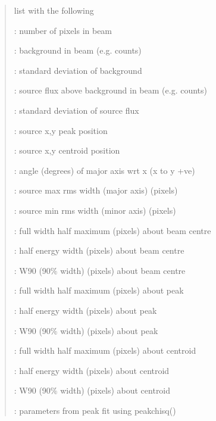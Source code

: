 \documentclass[letterpaper,10pt,english]{sphinxmanual}
\begin{document}
\begin{fulllineitems}
\begin{quote}
\begin{description}
\begin{DUlineblock}{0em}
\item[] list with the following
\item[] :    number of pixels in beam
\item[] :   background in beam (e.g. counts)
\item[] :  standard deviation of background
\item[] :    source flux above background in beam (e.g. counts)
\item[] :  standard deviation of source flux
\item[] :    source x,y peak position
\item[] :     source x,y centroid position
\item[] :     angle (degrees) of major axis wrt x (x to y +ve)
\item[] :    source max rms width (major axis) (pixels)
\item[] :    source min rms width (minor axis) (pixels)
\item[] :    full width half maximum (pixels) about beam centre
\item[] :     half energy width (pixels) about beam centre
\item[] :     W90 (90\% width) (pixels) about beam centre
\item[] :   full width half maximum (pixels) about peak
\item[] :    half energy width (pixels) about peak
\item[] :    W90 (90\% width) (pixels) about peak
\item[] :   full width half maximum (pixels) about centroid
\item[] :    half energy width (pixels) about centroid
\item[] :    W90 (90\% width) (pixels) about centroid
\item[] :     parameters from peak fit using peakchisq()
\end{DUlineblock}


\end{description}\end{quote}


\end{fulllineitems}
\end{document}
